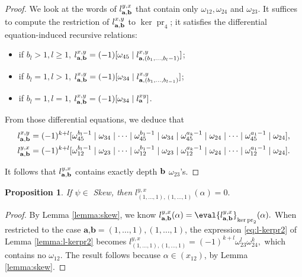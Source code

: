 \documentclass[a4paper,fleqn]{cas-sc}
\newtheorem{proposition}[theorem]{Proposition}
\DeclareMathOperator{\pr}{pr}
\begin{document}
\begin{proof}
	We look at the words of $l^{y,x}_{{\bf{a}},{\bf{b}}}$ that contain only $\omega_{12},\omega_{24}$ and $\omega_{23}$. It suffices to compute the restriction of $l^{x,y}_{\bf{a},\bf{b}}$ to $\ker \pr_4$; it satisfies the differential equation-induced recursive relations:
	\begin{itemize}
		\item if $b_l>1,l\ge1$, $l^{x,y}_{{\bf{a}},{\bf{b}}}=(-1)[\omega_{45} \mid l^{x,y}_{{\bf{a}},(b_1,\dots,b_l-1)}]$;
		\item if $b_l=1,l>1$, $l^{x,y}_{{\bf{a}},{\bf{b}}}=(-1)[\omega_{34} \mid l^{x,y}_{{\bf{a}},(b_1,\dots,b_{l-1})}]$;
		\item if $b_l=1,l=1$, $l^{x,y}_{{\bf{a}},{\bf{b}}}=(-1)[\omega_{34} \mid l^{xy}_{{\bf{a}}}]$.
	\end{itemize}
	From those differential equations, we deduce that 
	\begin{align}
    \label{eq:explicit-lxyab}
		l^{x,y}_{\bf{a},\bf{b}} & =(-1)^{k+l}[\omega^{b_l-1}_{45}\mid\omega_{34}\mid\dots \mid\omega^{b_1-1}_{45}\mid\omega_{34}\mid\omega^{a_k-1}_{45}\mid\omega_{24}\mid\dots \mid\omega^{a_1-1}_{45}\mid\omega_{24}], \\
        \label{eq:explicit-lxyab-2}
		l^{y,x}_{\bf{a},\bf{b}} & =(-1)^{k+l}[\omega^{b_l-1}_{12}\mid\omega_{23}\mid\dots \mid\omega^{b_1-1}_{12}\mid\omega_{23}\mid\omega^{a_k-1}_{12}\mid\omega_{24}\mid\dots \mid\omega^{a_1-1}_{12}\mid\omega_{24}].
	\end{align}

It follows that $l^{y,x}_{\bf{a},\bf{b}}$ contains exactly depth $\bf{b}$ $\omega_{23}$'s.
	
\end{proof}




\begin{proposition}\label{prop:vanishing}
	If $\psi \in$ Skew, then
	$
		l^{y,x}_{(1,\dots,1),(1,\dots,1)}(\alpha)=0.
	$
\end{proposition}

\begin{proof}
By Lemma \ref{lemma:skew}, we know
$
	l^{y,x}_{{\bf{a}},{\bf{b}}}(\alpha)= \eval{l^{y,x}_{\bf{a},\bf{b}}}_{{\ker \rm{pr}_2}}(\alpha).
$
When restricted to the case $\textbf{a,b} = (1,\dots,1),(1,\dots,1)$, the expression \eqref{eq:l-kerpr2} of Lemma \ref{lemma:l-kerpr2} becomes
$
	l^{y,x}_{(1,\dots,1),(1,\dots,1)}=(-1)^{k+l}\omega^{l}_{23}\omega^k_{24},
$
which contains no $\omega_{12}$. The result follows because $\alpha\in (x_{12})$, by Lemma \ref{lemma:skew}.
\end{proof}
\end{document}
